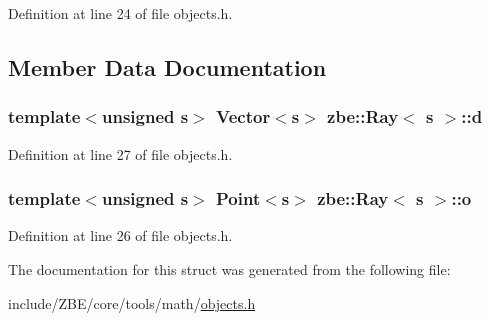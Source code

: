 Definition at line 24 of file objects.\+h.



\subsection{Member Data Documentation}
\hypertarget{structzbe_1_1_ray_a9b3d843a1155dc0746c3c28d0025b482}{}
\subsubsection[{d}]{\setlength{\rightskip}{0pt plus 5cm}template$<$unsigned s$>$ {\bf Vector}$<$s$>$ {\bf zbe\+::\+Ray}$<$ s $>$\+::d}\label{structzbe_1_1_ray_a9b3d843a1155dc0746c3c28d0025b482}


Definition at line 27 of file objects.\+h.

\hypertarget{structzbe_1_1_ray_a156f5831d3d67cb661b6c8b64bd10546}{}
\subsubsection[{o}]{\setlength{\rightskip}{0pt plus 5cm}template$<$unsigned s$>$ {\bf Point}$<$s$>$ {\bf zbe\+::\+Ray}$<$ s $>$\+::o}\label{structzbe_1_1_ray_a156f5831d3d67cb661b6c8b64bd10546}


Definition at line 26 of file objects.\+h.



The documentation for this struct was generated from the following file\+:\begin{DoxyCompactItemize}
\item 
include/\+Z\+B\+E/core/tools/math/\hyperlink{objects_8h}{objects.\+h}\end{DoxyCompactItemize}
